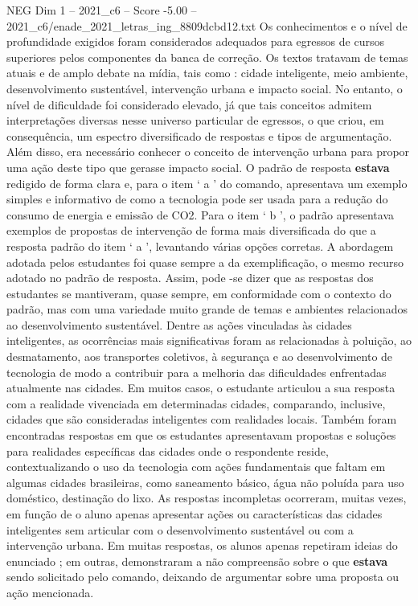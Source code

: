 \begin{textsample}{NEG Dim 1 – 2021\_c6 – Score -5.00 – 2021\_c6/enade\_2021\_letras\_ing\_8809dcbd12.txt}
Os conhecimentos e o nível de profundidade exigidos foram considerados adequados para egressos de cursos superiores pelos componentes da banca de correção.
Os textos tratavam de temas atuais e de amplo debate na mídia, tais como : cidade inteligente, meio ambiente, desenvolvimento sustentável, intervenção urbana e impacto social.
No entanto, o nível de dificuldade foi considerado elevado, já que tais conceitos admitem interpretações diversas nesse universo particular de egressos, o que criou, em consequência, um espectro diversificado de respostas e tipos de argumentação.
Além disso, era necessário conhecer o conceito de intervenção urbana para propor uma ação deste tipo que gerasse impacto social.
O padrão de resposta \textbf{estava} redigido de forma clara e, para o item ‘ a ’ do comando, apresentava um exemplo simples e informativo de como a tecnologia pode ser usada para a redução do consumo de energia e emissão de CO2.
Para o item ‘ b ’, o padrão apresentava exemplos de propostas de intervenção de forma mais diversificada do que a resposta padrão do item ‘ a ’, levantando várias opções corretas.
A abordagem adotada pelos estudantes foi quase sempre a da exemplificação, o mesmo recurso adotado no padrão de resposta.
Assim, pode -se dizer que as respostas dos estudantes se mantiveram, quase sempre, em conformidade com o contexto do padrão, mas com uma variedade muito grande de temas e ambientes relacionados ao desenvolvimento sustentável.
Dentre as ações vinculadas às cidades inteligentes, as ocorrências mais significativas foram as relacionadas à poluição, ao desmatamento, aos transportes coletivos, à segurança e ao desenvolvimento de tecnologia de modo a contribuir para a melhoria das dificuldades enfrentadas atualmente nas cidades.
Em muitos casos, o estudante articulou a sua resposta com a realidade vivenciada em determinadas cidades, comparando, inclusive, cidades que são consideradas inteligentes com realidades locais.
Também foram encontradas respostas em que os estudantes apresentavam propostas e soluções para realidades específicas das cidades onde o respondente reside, contextualizando o uso da tecnologia com ações fundamentais que faltam em algumas cidades brasileiras, como saneamento básico, água não poluída para uso doméstico, destinação do lixo.
As respostas incompletas ocorreram, muitas vezes, em função de o aluno apenas apresentar ações ou características das cidades inteligentes sem articular com o desenvolvimento sustentável ou com a intervenção urbana.
Em muitas respostas, os alunos apenas repetiram ideias do enunciado ; em outras, demonstraram a não compreensão sobre o que \textbf{estava} sendo solicitado pelo comando, deixando de argumentar sobre uma proposta ou ação mencionada.

\end{textsample}
